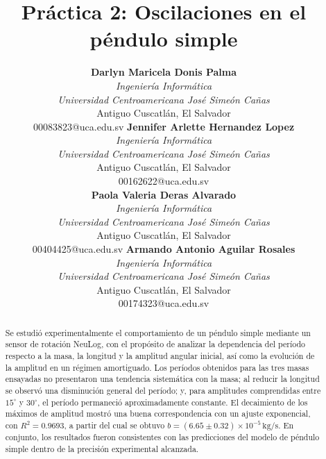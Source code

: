 \documentclass[conference]{Plantilla_LATEX/IEEEtran}
\begin{document}
\title{Práctica 2: Oscilaciones en el péndulo simple }

\author{
\begin{tabular}{@{}c@{\hspace{0.07\textwidth}}c@{}}
\parbox[t]{0.43\textwidth}{\centering
  {\normalsize\textbf{Darlyn Maricela Donis Palma}}\\
  {\small \textit{Ingeniería Informática}\\
  \textit{Universidad Centroamericana José Simeón Cañas}\\
  Antiguo Cuscatlán, El Salvador\\
  00083823@uca.edu.sv}
}
&
\parbox[t]{0.43\textwidth}{\centering
  {\normalsize\textbf{Jennifer Arlette Hernandez Lopez}}\\
  {\small \textit{Ingeniería Informática}\\
  \textit{Universidad Centroamericana José Simeón Cañas}\\
  Antiguo Cuscatlán, El Salvador\\
  00162622@uca.edu.sv}
}\\[10.0ex]
\parbox[t]{0.43\textwidth}{\centering
  {\normalsize\textbf{Paola Valeria Deras Alvarado}}\\
  {\small \textit{Ingeniería Informática}\\
  \textit{Universidad Centroamericana José Simeón Cañas}\\
  Antiguo Cuscatlán, El Salvador\\
  00404425@uca.edu.sv}
}
&
\parbox[t]{0.43\textwidth}{\centering
  {\normalsize\textbf{Armando Antonio Aguilar Rosales}}\\
  {\small \textit{Ingeniería Informática}\\
  \textit{Universidad Centroamericana José Simeón Cañas}\\
  Antiguo Cuscatlán, El Salvador\\
  00174323@uca.edu.sv}
}
\end{tabular}
}

\maketitle

\begin{abstract}
Se estudió experimentalmente el comportamiento de un péndulo simple mediante un sensor de rotación NeuLog, con el propósito de analizar la dependencia del período respecto a la masa, la longitud y la amplitud angular inicial, así como la evolución de la amplitud en un régimen amortiguado. Los períodos obtenidos para las tres masas ensayadas no presentaron una tendencia sistemática con la masa; al reducir la longitud se observó una disminución general del período; y, para amplitudes comprendidas entre $15^\circ$ y $30^\circ$, el período permaneció aproximadamente constante. El decaimiento de los máximos de amplitud mostró una buena correspondencia con un ajuste exponencial, con $R^2=0.9693$, a partir del cual se obtuvo $b=(6.65\pm0.32)\times10^{-5}\,\mathrm{kg/s}$. En conjunto, los resultados fueron consistentes con las predicciones del modelo de péndulo simple dentro de la precisión experimental alcanzada.
\end{abstract}
\end{document}
